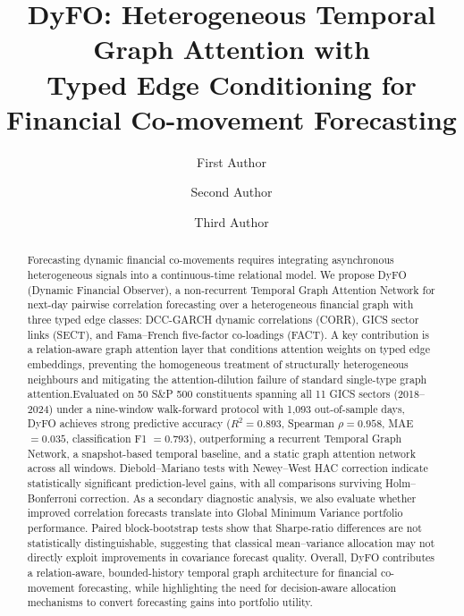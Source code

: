 \documentclass[runningheads]{llncs}
\begin{document}
%
\title{DyFO: Heterogeneous Temporal Graph Attention with\\
Typed Edge Conditioning for Financial Co-movement Forecasting}
%
%
\author{First Author \and
Second Author \and
Third Author}
%
%
%
\maketitle              %
%
\begin{abstract}
Forecasting dynamic financial co-movements requires integrating asynchronous heterogeneous signals into a continuous-time relational model. We propose DyFO (Dynamic Financial Observer), a non-recurrent Temporal Graph Attention Network for next-day pairwise correlation forecasting over a heterogeneous financial graph with three typed edge classes: DCC-GARCH dynamic correlations (CORR), GICS sector links (SECT), and Fama--French five-factor co-loadings (FACT). A key contribution is a relation-aware graph attention layer that conditions attention weights on typed edge embeddings, preventing the homogeneous treatment of structurally heterogeneous neighbours and mitigating the attention-dilution failure of standard single-type graph attention.Evaluated on 50 S\&P 500 constituents spanning all 11 GICS sectors (2018--2024) under a nine-window walk-forward protocol with 1,093 out-of-sample days, DyFO achieves strong predictive accuracy ($R^2 = 0.893$, Spearman $\rho = 0.958$, MAE $= 0.035$, classification F1 $= 0.793$), outperforming a recurrent Temporal Graph Network, a snapshot-based temporal baseline, and a static graph attention network across all windows. Diebold--Mariano tests with Newey--West HAC correction indicate statistically significant prediction-level gains, with all comparisons surviving Holm--Bonferroni correction. As a secondary diagnostic analysis, we also evaluate whether improved correlation forecasts translate into Global Minimum Variance portfolio performance. Paired block-bootstrap tests show that Sharpe-ratio differences are not statistically distinguishable, suggesting that classical mean--variance allocation may not directly exploit improvements in covariance forecast quality. Overall, DyFO contributes a relation-aware, bounded-history temporal graph architecture for financial co-movement forecasting, while highlighting the need for decision-aware allocation mechanisms to convert forecasting gains into portfolio utility.
\end{abstract}
\end{document}
